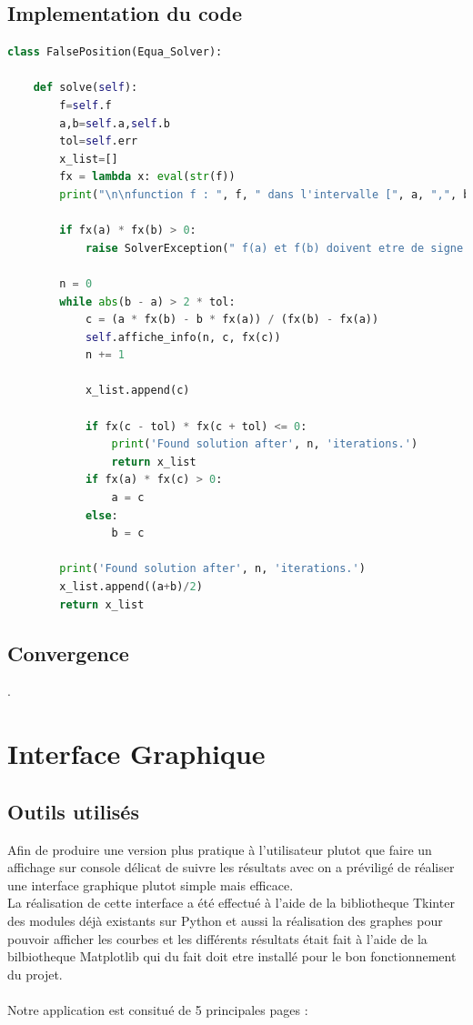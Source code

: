 \documentclass{article}
\begin{document}
\subsection{Implementation du code}
\begin{lstlisting}[language=Python, caption=Méthode de la Fausse Position en Python]
class FalsePosition(Equa_Solver):

    def solve(self):
        f=self.f
        a,b=self.a,self.b
        tol=self.err
        x_list=[]
        fx = lambda x: eval(str(f))
        print("\n\nfunction f : ", f, " dans l'intervalle [", a, ",", b, "] \n", "--------------------------------")

        if fx(a) * fx(b) > 0:
            raise SolverException(" f(a) et f(b) doivent etre de signe different !")

        n = 0
        while abs(b - a) > 2 * tol:
            c = (a * fx(b) - b * fx(a)) / (fx(b) - fx(a))
            self.affiche_info(n, c, fx(c))
            n += 1

            x_list.append(c)

            if fx(c - tol) * fx(c + tol) <= 0:
                print('Found solution after', n, 'iterations.')
                return x_list
            if fx(a) * fx(c) > 0:
                a = c
            else:
                b = c
            
        print('Found solution after', n, 'iterations.')
        x_list.append((a+b)/2)
        return x_list
\end{lstlisting}
\newpage
\subsection{Convergence}
.

\newpage
\section{Interface Graphique}
\subsection{Outils utilisés}
Afin de produire une version plus pratique à l'utilisateur plutot que faire un affichage sur console délicat de suivre les résultats avec on a préviligé de réaliser une interface graphique plutot simple mais efficace.\\
La réalisation de cette interface a été effectué à l'aide de la bibliotheque Tkinter des modules déjà existants sur Python et aussi la réalisation des graphes pour pouvoir afficher les courbes et les différents résultats était fait à l'aide de la bilbiotheque Matplotlib qui du fait doit etre installé pour le bon fonctionnement du projet.
\\ \\
Notre application est consitué de 5 principales pages :
\end{document}
